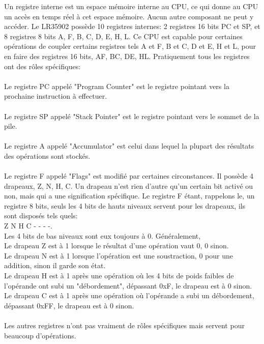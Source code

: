\documentclass{report}
\begin{document}
Un registre interne est un espace mémoire interne au CPU, ce qui donne au CPU un accès en temps réel à cet espace mémoire. Aucun autre composant ne peut y accéder.
Le LR35902 possède 10 registres internes: 2 registres 16 bits PC et SP, et 8 registres 8 bits A, F, B, C, D, E, H, L.
Ce CPU est capable pour certaines opérations de coupler certains registres tels A et F, B et C, D et E, H et L, pour en faire des registres 16 bits, AF, BC, DE, HL.
Pratiquement tous les registres ont des rôles spécifiques:\\\\
Le registre PC appelé "Program Counter" est le registre pointant vers la prochaine instruction à effectuer.\\\\
Le registre SP appelé "Stack Pointer" est le registre pointant vers le sommet de la pile.\\\\
Le registre A appelé "Accumulator" est celui dans lequel la plupart des résultats des opérations sont stockés.\\\\
Le registre F appelé "Flags" est modifié par certaines circonstances.
Il possède 4 drapeaux, Z, N, H, C. Un drapeau n'est rien d'autre qu'un certain bit activé ou non, mais qui a une signification spécifique.
Le registre F étant, rappelons le, un registre 8 bits, seuls les 4 bits de hauts niveaux servent pour les drapeaux, 
ils sont disposés tels quels: \\Z N H C - - - -.\\Les 4 bits de bas niveaux sont eux toujours à 0.
Généralement, \\Le drapeau Z est à 1 lorsque le résultat d'une opération vaut 0, 0 sinon.\\
Le drapeau N est à 1 lorsque l'opération est une soustraction, 0 pour une addition, sinon il garde son état.\\
Le drapeau H est à 1 après une opération où les 4 bits de poids faibles de l'opérande ont subi un "débordement", dépassant 0xF, le drapeau est à 0 sinon.\\
Le drapeau C est à 1 après une opération où l'opérande a subi un débordement, dépassant 0xFF, le drapeau est à 0 sinon.\\\\
Les autres registres n'ont pas vraiment de rôles spécifiques mais servent pour beaucoup d'opérations.
\end{document}
